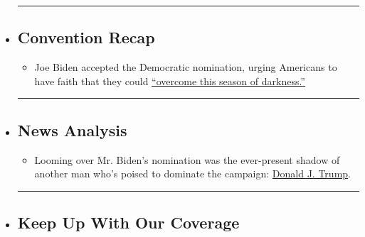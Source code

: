 \begin{itemize}
\item
  \begin{center}\rule{0.5\linewidth}{\linethickness}\end{center}

  \hypertarget{convention-recap}{%
  \subsection{Convention Recap}\label{convention-recap}}

  \begin{itemize}
  \tightlist
  \item
    Joe Biden accepted the Democratic nomination, urging Americans to
    have faith that they could
    \href{https://www.nytimes3xbfgragh.onion/2020/08/20/us/politics/Joe-Biden-accepts-democratic-nomination.html?action=click\&pgtype=Article\&state=default\&region=BELOW_MAIN_CONTENT\&context=storylines_guide}{``overcome
    this season of darkness.''}
  \end{itemize}
\item
  \begin{center}\rule{0.5\linewidth}{\linethickness}\end{center}

  \hypertarget{news-analysis}{%
  \subsection{News Analysis}\label{news-analysis}}

  \begin{itemize}
  \tightlist
  \item
    Looming over Mr. Biden's nomination was the ever-present shadow of
    another man who's poised to dominate the campaign:
    \href{https://www.nytimes3xbfgragh.onion/2020/08/20/us/politics/biden-dnc-speech-trump.html?action=click\&pgtype=Article\&state=default\&region=BELOW_MAIN_CONTENT\&context=storylines_guide}{Donald
    J. Trump}.
  \end{itemize}
\item
  \begin{center}\rule{0.5\linewidth}{\linethickness}\end{center}

  \hypertarget{keep-up-with-our-coverage}{%
  \subsection{Keep Up With Our
  Coverage}\label{keep-up-with-our-coverage}}


\end{itemize}
